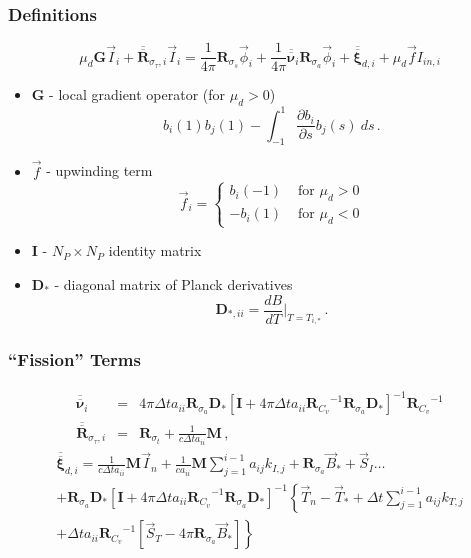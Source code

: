 \documentclass{beamer}
\newcommand{\be}{\begin{equation*}}   %
\newcommand{\ee}{\end{equation*}}
\newcommand{\bea}{\begin{eqnarray*}}  %
\newcommand{\eea}{\end{eqnarray*}}
\newcommand{\B}[1]{\ensuremath{b_{#1} }}			%
\newcommand{\R}[1]{\ensuremath{\mathbf{R}_{#1}}}
\newcommand{\D}{\ensuremath{ \mathbf{D}_* }}
\newcommand{\M}{\ensuremath{ \mathbf M}}
\newcommand{\p}{\ensuremath{ \partial}}			%
\newcommand{\pec}{\, ,}
\newcommand{\pep}{\, .}
\begin{document}
\begin{frame}
\frametitle{Definitions}
\vspace{-0.2in}
\be
\mu_d\mathbf{G} \vec{I}_i + \overline{\overline{\mathbf R}}_{\sigma_{\tau},i}\vec{I}_i = \frac{1}{4\pi}\R{\sigma_s}\vec{\phi}_i + \frac{1}{4\pi}\overline{\overline{\mathbf \nu}}_i \R{\sigma_a}\vec{\phi}_i + \overline{\overline{\mathbf \xi}}_{d,i} + \mu_d\vec{f}I_{in,i}
\ee
\vspace{-0.1in}
\begin{itemize}
\item $\mathbf{G}$ - local gradient operator (for $\mu_d > 0$)
\be
\B{i}(1)\B{j}(1) - \int_{-1}^1{\frac{\p \B{i}}{\p s}\B{j}(s)~ds} \pep
\ee
\item $\vec{f}$ - upwinding term 
\be
\vec{f}_i = \left\{ 
\begin{array}{ll}
\B{i}(-1)  & \text{  for } \mu_d>0 \\
-\B{i}(1)  & \text{  for } \mu_d<0 
\end{array}\right.
\ee
\item $\mathbf{I}$ - $N_P \times N_P$ identity matrix
\item $\D$ - diagonal matrix of Planck derivatives
\be
\mathbf{D}_{*,ii} = \frac{d B}{d T} \bigg \lvert_{T = T_{i,*}} \pep
\ee 
\end{itemize}
\end{frame}

\begin{frame}
\frametitle{``Fission'' Terms}
\bea
\overline{\overline{\mathbf \nu}}_i &=& 4\pi \Delta t a_{ii} \R{\sigma_a} \D \left[\mathbf{I} + 4\pi\Delta t a_{ii}\R{C_v}^{-1}\R{\sigma_a}\D  \right]^{-1}\R{C_v}^{-1}
\\
\overline{\overline{\mathbf R}}_{\sigma_{\tau},i} &=& \R{\sigma_t} + \frac{1}{c\Delta t a_{ii}}\M \pec
\eea
\begin{multline*}
\overline{\overline{\mathbf \xi}}_{d,i}  = \frac{1}{c\Delta t a_{ii}}\M\vec{I}_n + \frac{1}{c a_{ii}} \M \sum_{j=1}^{i-1}{a_{ij} k_{I,j}   } + \R{\sigma_a}\vec{B}_*  + \vec{S}_I \dots \\
+ \R{\sigma_a} \D
\left[\mathbf{I} + 4\pi \Delta t a_{ii}\R{C_v}^{-1}\R{\sigma_a} \D \right]^{-1}
\left \{
\vec{T}_n - \vec{T}_* + \Delta t \sum_{j=1}^{i-1}{a_{ij} k_{T,j} }  \right.  \\
\left. + \Delta t a_{ii} \R{C_v}^{-1}\left[\vec{S}_T - 4\pi\R{\sigma_a} \vec{B}_* \right] \right \} 
\end{multline*}
\end{frame}
\end{document}
